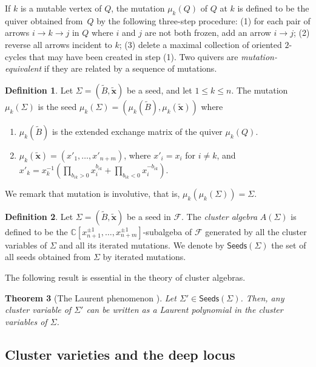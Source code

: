 \documentclass{amsart}
\newcommand{\seed}{\Sigma}
\newcommand{\excluster}[1]{\widetilde{\mathbf{#1}}}
\newcommand{\exmatrix}[1]{\widetilde{#1}}
\newcommand{\C}{\mathbb{C}}
\newcommand{\seeds}{\mathsf{Seeds}}
\numberwithin{equation}{section}
\newtheorem{theorem}{Theorem}[section]
\theoremstyle{definition}
\newtheorem{definition}[theorem]{Definition}
\newcommand{\ambient}{\mathcal{F}}
\begin{document}
If $k$ is a mutable vertex of $Q$, the mutation $\mu_k(Q)$  of $Q$ at $k$ is defined to be the quiver obtained from~$Q$ by the following three-step procedure: (1) for each pair of arrows $i \to k \to j$ in $Q$ where $i$ and $j$ are not both frozen, add an arrow $i \to j$; (2) reverse all arrows incident to $k$; (3) delete a maximal collection of oriented $2$-cycles that may have been created in step (1).
Two quivers are \emph{mutation-equivalent} if they are related by a sequence of mutations.

\begin{definition}
    Let $\seed = (\exmatrix{B}, \excluster{x})$ be a seed, and let $1 \leq k \leq n$. The mutation $\mu_k(\seed)$ is the seed $\mu_k(\seed) = (\mu_k(\exmatrix{B}), \mu_k(\excluster{x}))$ where 
    \begin{enumerate}
        \item $\mu_k(\exmatrix{B})$ is the extended exchange matrix of the quiver $\mu_k(Q)$. 
        \item $\mu_k(\excluster{x}) = (x'_1, \dots, x'_{n+m})$, where $x'_i = x_i$ for $i \neq k$, and $x'_k = x_k^{-1}\left(\prod_{b_{ik} > 0}x_i^{b_{ik}} + \prod_{b_{ik} < 0}x_i^{-b_{ik}}\right)$. 
    \end{enumerate}
\end{definition}

We remark that mutation is involutive, that is, $\mu_k(\mu_k(\seed)) = \seed$. 

\begin{definition}
    Let $\seed = (\exmatrix{B}, \excluster{x})$ be a seed in $\ambient$. The \emph{cluster algebra} $A(\seed)$ is defined to be the $\C[x_{n+1}^{\pm1}, \dots, x_{n+m}^{\pm 1}]$-subalgeba of $\ambient$ generated by all the cluster variables of $\seed$ and all its iterated mutations. We denote by $\seeds(\seed)$ the set of all seeds obtained from $\seed$ by iterated mutations.
\end{definition}

The following result is essential in the theory of cluster algebras.

\begin{theorem}[The Laurent phenomenon \cite{LP}]
Let $\seed' \in \seeds(\seed)$. Then, any cluster variable of $\seed'$ can be written as a Laurent polynomial in the cluster variables of $\seed$. 
\end{theorem}

\subsection{Cluster varieties and the deep locus} 
\end{document}
